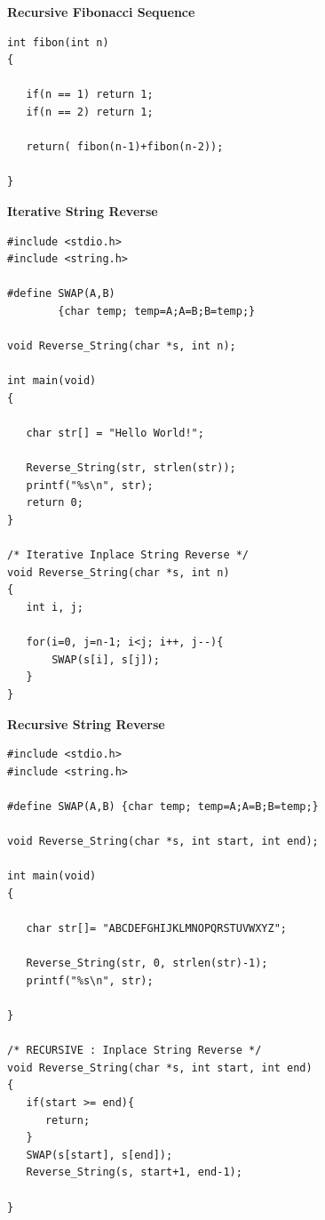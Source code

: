 \documentclass[a4,portraitt]{slides}
\begin{document}
\newpage
{\samepage
\begin{center}
{\Large{\bf Recursive Fibonacci Sequence}}
\end{center}
\begin{verbatim}
int fibon(int n)
{

   if(n == 1) return 1;
   if(n == 2) return 1;

   return( fibon(n-1)+fibon(n-2));

}
\end{verbatim}
}

\newpage
{\samepage
\begin{center}
{\Large{\bf Iterative String Reverse}}
\end{center}
{\small
\begin{verbatim}
#include <stdio.h>
#include <string.h>

#define SWAP(A,B)
        {char temp; temp=A;A=B;B=temp;}

void Reverse_String(char *s, int n);

int main(void)
{

   char str[] = "Hello World!";

   Reverse_String(str, strlen(str));
   printf("%s\n", str);
   return 0;
}

/* Iterative Inplace String Reverse */
void Reverse_String(char *s, int n)
{
   int i, j;

   for(i=0, j=n-1; i<j; i++, j--){
       SWAP(s[i], s[j]);
   }
}
\end{verbatim}
}}

\newpage
{\samepage
\begin{center}
{\Large{\bf Recursive String Reverse}}
\end{center}
{\small
\begin{verbatim}
#include <stdio.h>
#include <string.h>

#define SWAP(A,B) {char temp; temp=A;A=B;B=temp;}

void Reverse_String(char *s, int start, int end);

int main(void)
{

   char str[]= "ABCDEFGHIJKLMNOPQRSTUVWXYZ";

   Reverse_String(str, 0, strlen(str)-1);
   printf("%s\n", str);

}

/* RECURSIVE : Inplace String Reverse */
void Reverse_String(char *s, int start, int end)
{
   if(start >= end){
      return;
   }
   SWAP(s[start], s[end]);
   Reverse_String(s, start+1, end-1);

}
\end{verbatim}
}
}
\end{document}
